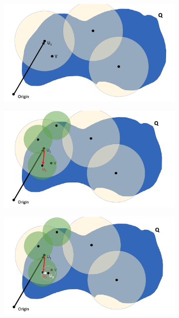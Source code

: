 \begin{figure}[ht!]
    \centering
    \begin{subfigure}[t]{0.45\textwidth}
        \includegraphics[width=\textwidth]{figures/chaining_1.png}
        \caption{}
        \label{lec9:fig:chaining_1}
    \end{subfigure}
    \hfill
    \begin{subfigure}[t]{0.45\textwidth}
        \includegraphics[width=\textwidth]{figures/chaining_2.png}
        \caption{}
        \label{lec9:fig:chaining_2}
    \end{subfigure}
    \hfill
    \begin{subfigure}[t]{0.45\textwidth}
        \includegraphics[width=\textwidth]{figures/chaining_3.png}

\end{subfigure}
\end{figure}
